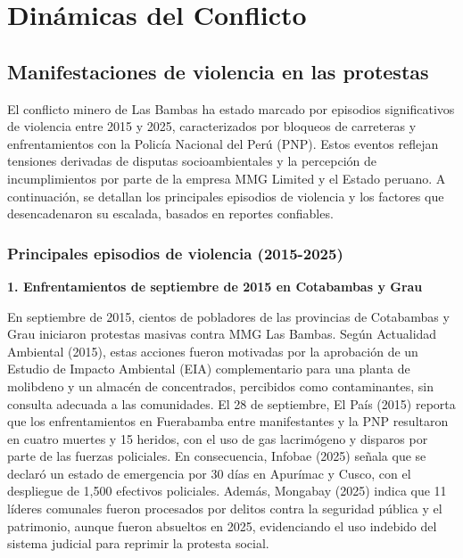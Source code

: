 \documentclass[
  stu,
  floatsintext,
  longtable,
  a4paper,
  nolmodern,
  notxfonts,
  notimes,
  colorlinks=true,linkcolor=blue,citecolor=blue,urlcolor=blue]{apa7}
\begin{document}
\section{Dinámicas del Conflicto}\label{dinuxe1micas-del-conflicto}

\subsection{Manifestaciones de violencia en las
protestas}\label{manifestaciones-de-violencia-en-las-protestas}

El conflicto minero de Las Bambas ha estado marcado por episodios
significativos de violencia entre 2015 y 2025, caracterizados por
bloqueos de carreteras y enfrentamientos con la Policía Nacional del
Perú (PNP). Estos eventos reflejan tensiones derivadas de disputas
socioambientales y la percepción de incumplimientos por parte de la
empresa MMG Limited y el Estado peruano. A continuación, se detallan los
principales episodios de violencia y los factores que desencadenaron su
escalada, basados en reportes confiables.

\subsubsection{Principales episodios de violencia
(2015-2025)}\label{principales-episodios-de-violencia-2015-2025}

\textbf{1. Enfrentamientos de septiembre de 2015 en Cotabambas y Grau}

En septiembre de 2015, cientos de pobladores de las provincias de
Cotabambas y Grau iniciaron protestas masivas contra MMG Las Bambas.
Según Actualidad Ambiental (2015), estas acciones fueron motivadas por
la aprobación de un Estudio de Impacto Ambiental (EIA) complementario
para una planta de molibdeno y un almacén de concentrados, percibidos
como contaminantes, sin consulta adecuada a las comunidades. El 28 de
septiembre, El País (2015) reporta que los enfrentamientos en Fuerabamba
entre manifestantes y la PNP resultaron en cuatro muertes y 15 heridos,
con el uso de gas lacrimógeno y disparos por parte de las fuerzas
policiales. En consecuencia, Infobae (2025) señala que se declaró un
estado de emergencia por 30 días en Apurímac y Cusco, con el despliegue
de 1,500 efectivos policiales. Además, Mongabay (2025) indica que 11
líderes comunales fueron procesados por delitos contra la seguridad
pública y el patrimonio, aunque fueron absueltos en 2025, evidenciando
el uso indebido del sistema judicial para reprimir la protesta social.
\end{document}

